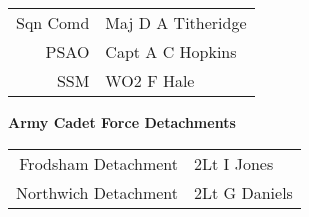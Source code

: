 \begin{center}
  \begin{tabular}{rl}
    Sqn Comd & Maj D A Titheridge \\
    PSAO & Capt A C Hopkins \\
    SSM & WO2 F Hale \\
  \end{tabular}
\end{center}

\vspace{10mm}

\begin{center}
  \Large
  \textbf{Army Cadet Force Detachments}
\end{center}

\begin{center}
  \begin{tabular}{rl}
    Frodsham Detachment & 2Lt I Jones \\
    Northwich Detachment & 2Lt G Daniels \\
  \end{tabular}
\end{center}